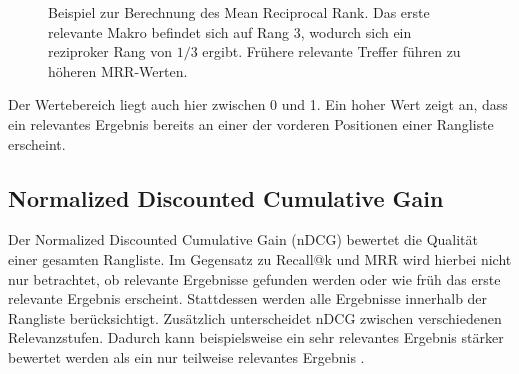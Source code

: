 \begin{figure}[H] 
  \centering 
  \caption{Beispiel zur Berechnung des Mean Reciprocal Rank. Das erste relevante Makro befindet sich auf Rang 3, wodurch sich ein reziproker Rang von $1/3$ ergibt. Frühere relevante Treffer führen zu höheren MRR-Werten.} 
  \label{fig:mrr_beispiel} 
\end{figure}

Der Wertebereich liegt auch hier zwischen 0 und 1. Ein hoher Wert zeigt an, dass ein relevantes Ergebnis bereits an einer der vorderen Positionen einer Rangliste erscheint. 

\subsection{Normalized Discounted Cumulative Gain}
\label{sec:ndcg} 

Der Normalized Discounted Cumulative Gain (nDCG) bewertet die Qualität einer gesamten Rangliste. Im Gegensatz zu Recall@k und MRR wird hierbei nicht nur betrachtet, 
ob relevante Ergebnisse gefunden werden oder wie früh das erste relevante Ergebnis erscheint. 
Stattdessen werden alle Ergebnisse innerhalb der Rangliste berücksichtigt. Zusätzlich unterscheidet nDCG zwischen verschiedenen Relevanzstufen. 
Dadurch kann beispielsweise ein sehr relevantes Ergebnis stärker bewertet werden als ein nur teilweise relevantes Ergebnis \parencite{jarvelin2002dcg}. 

